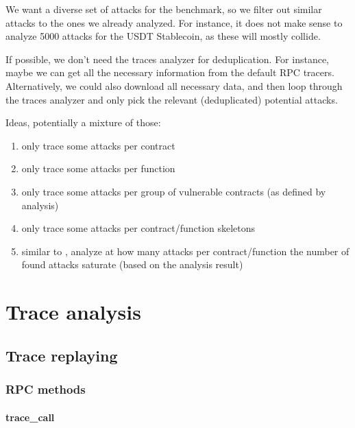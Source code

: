 \documentclass[draft,final]{vutinfth} %
\begin{document}
We want a diverse set of attacks for the benchmark, so we filter out similar attacks to the ones we already analyzed. For instance, it does not make sense to analyze 5000 attacks for the USDT Stablecoin, as these will mostly collide.

If possible, we don't need the traces analyzer for deduplication. For instance, maybe we can get all the necessary information from the default RPC tracers.
Alternatively, we could also download all necessary data, and then loop through the traces analyzer and only pick the relevant (deduplicated) potential attacks.

Ideas, potentially a mixture of those:

\begin{enumerate}
    \item only trace some attacks per contract
    \item only trace some attacks per function
    \item only trace some attacks per group of vulnerable contracts (as defined by analysis)
    \item only trace some attacks per contract/function skeletons
    \item similar to \cite{}, analyze at how many attacks per contract/function the number of found attacks saturate (based on the analysis result)
\end{enumerate}

\chapter{Trace analysis}

\section{Trace replaying}

\subsection{RPC methods}



\subsubsection{trace\_call}
\end{document}
